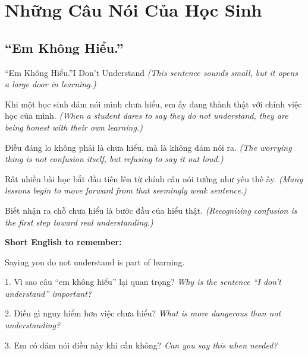 \chapter{Những Câu Nói Của Học Sinh}

\section{``Em Không Hiểu.''}
\begin{truyen}{``Em Không Hiểu.''}{I Don't Understand}
\textit{(This sentence sounds small, but it opens a large door in learning.)}

Khi một học sinh dám nói mình chưa hiểu, em ấy đang thành thật với chính việc học của mình.
\textit{(When a student dares to say they do not understand, they are being honest with their own learning.)}

Điều đáng lo không phải là chưa hiểu, mà là không dám nói ra.
\textit{(The worrying thing is not confusion itself, but refusing to say it out loud.)}

Rất nhiều bài học bắt đầu tiến lên từ chính câu nói tưởng như yếu thế ấy.
\textit{(Many lessons begin to move forward from that seemingly weak sentence.)}
\end{truyen}

\begin{baihoc}
Biết nhận ra chỗ chưa hiểu là bước đầu của hiểu thật.
\textit{(Recognizing confusion is the first step toward real understanding.)}
\end{baihoc}

\begin{ghinhoanh}
\textbf{Short English to remember:}

Saying you do not understand is part of learning.

\end{ghinhoanh}

\begin{tuhocnhanh}
1. Vì sao câu ``em không hiểu'' lại quan trọng? \textit{Why is the sentence ``I don't understand'' important?}

2. Điều gì nguy hiểm hơn việc chưa hiểu? \textit{What is more dangerous than not understanding?}

3. Em có dám nói điều này khi cần không? \textit{Can you say this when needed?}
\end{tuhocnhanh}
\ngancach

